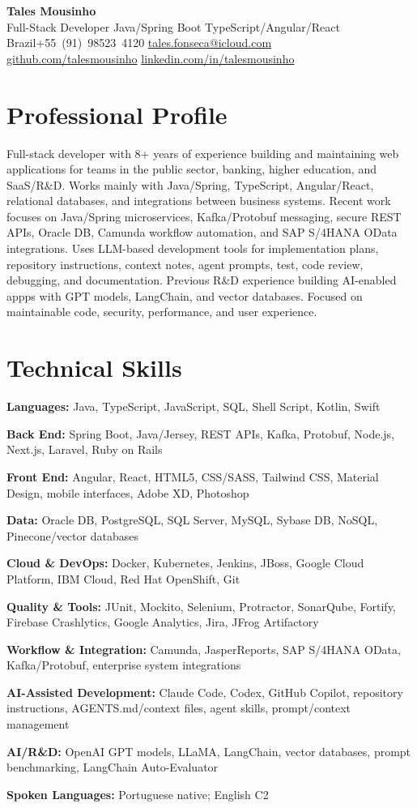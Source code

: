 \documentclass[10pt,a4paper]{article}
\newcommand{\contactsep}{\;\textbullet\;}
\newcommand{\skillline}[2]{\textbf{#1:} #2\par}
\begin{document}
{\centering
  {\LARGE\bfseries Tales Mousinho}\\[0.25em]
  {\large\color{accent}Full-Stack Developer \textbullet{} Java/Spring Boot \textbullet{} TypeScript/Angular/React}\\[0.3em]
  {\small Brazil\contactsep \mbox{+55~(91)~98523~4120}\contactsep
  \href{mailto:tales.fonseca@icloud.com}{tales.fonseca@icloud.com}}\\[0.15em]
  {\small \href{https://github.com/talesmousinho}{github.com/talesmousinho}\contactsep
  \href{https://www.linkedin.com/in/talesmousinho}{linkedin.com/in/talesmousinho}}
  \par
}

\section{Professional Profile}
Full-stack developer with 8+ years of experience building and maintaining web applications for teams in the public sector, banking, higher education, and SaaS/R\&D. Works mainly with Java/Spring, TypeScript, Angular/React, relational databases, and integrations between business systems. Recent work focuses on Java/Spring microservices, Kafka/Protobuf messaging, secure REST APIs, Oracle DB, Camunda workflow automation, and SAP S/4HANA OData integrations. Uses LLM-based development tools for implementation plans, repository instructions, context notes, agent prompts, test, code review, debugging, and documentation. Previous R\&D experience building AI-enabled appps with GPT models, LangChain, and vector databases. Focused on maintainable code, security, performance, and user experience.

\section{Technical Skills}
{\small
\skillline{Languages}{Java, TypeScript, JavaScript, SQL, Shell Script, Kotlin, Swift}
\skillline{Back End}{Spring Boot, Java/Jersey, REST APIs, Kafka, Protobuf, Node.js, Next.js, Laravel, Ruby on Rails}
\skillline{Front End}{Angular, React, HTML5, CSS/SASS, Tailwind CSS, Material Design, mobile interfaces, Adobe XD, Photoshop}
\skillline{Data}{Oracle DB, PostgreSQL, SQL Server, MySQL, Sybase DB, NoSQL, Pinecone/vector databases}
\skillline{Cloud \& DevOps}{Docker, Kubernetes, Jenkins, JBoss, Google Cloud Platform, IBM Cloud, Red Hat OpenShift, Git}
\skillline{Quality \& Tools}{JUnit, Mockito, Selenium, Protractor, SonarQube, Fortify, Firebase Crashlytics, Google Analytics, Jira, JFrog Artifactory}
\skillline{Workflow \& Integration}{Camunda, JasperReports, SAP S/4HANA OData, Kafka/Protobuf, enterprise system integrations}
\skillline{AI-Assisted Development}{Claude Code, Codex, GitHub Copilot, repository instructions, AGENTS.md/context files, agent skills, prompt/context management}
\skillline{AI/R\&D}{OpenAI GPT models, LLaMA, LangChain, vector databases, prompt benchmarking, LangChain Auto-Evaluator}
\skillline{Spoken Languages}{Portuguese native; English C2}
}
\end{document}
